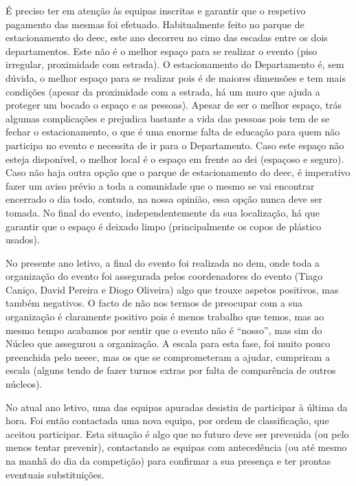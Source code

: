 É preciso ter em atenção às equipas inscritas e garantir que o respetivo pagamento das mesmas foi efetuado. Habitualmente feito no parque de estacionamento do \acrshort{deec}, este ano decorreu no cimo das escadas entre os dois departamentos. Este não é o melhor espaço para se realizar o evento (piso irregular, proximidade com estrada). O estacionamento do Departamento é, sem dúvida, o melhor espaço para se realizar pois é de maiores dimensões e tem mais condições (apesar da proximidade com a estrada, há um muro que ajuda a proteger um bocado o espaço e as pessoas). Apesar de ser o melhor espaço, trás algumas complicações e prejudica bastante a vida das pessoas pois tem de se fechar o estacionamento, o que é uma enorme falta de educação para quem não participa no evento e necessita de ir para o Departamento. Caso este espaço não esteja disponível, o melhor local é o espaço em frente ao \acrshort{dei} (espaçoso e seguro). Caso não haja outra opção que o parque de estacionamento do \acrshort{deec}, é imperativo fazer um aviso prévio a toda a comunidade que o mesmo se vai encontrar encerrado o dia todo, contudo, na nossa opinião, essa opção nunca deve ser tomada. No final do evento, independentemente da sua localização, há que garantir que o espaço é deixado limpo (principalmente os copos de plástico usados).

No presente ano letivo, a final do evento foi realizada no \acrshort{dem}, onde toda a organização do evento foi assegurada pelos coordenadores do evento (Tiago Caniço, David Pereira e Diogo Oliveira) algo que trouxe aspetos positivos, mas também negativos. O facto de não nos termos de preocupar com a sua organização é claramente positivo pois é menos trabalho que temos, mas ao mesmo tempo acabamos por sentir que o evento não é “nosso”, mas sim do Núcleo que assegurou a organização. A escala para esta fase, foi muito pouco preenchida pelo \acrshort{neeec}, mas os que se comprometeram a ajudar, cumpriram a escala (alguns tendo de fazer turnos extras por falta de comparência de outros núcleos).

No atual ano letivo, uma das equipas apuradas desistiu de participar à última da hora. Foi então contactada uma nova equipa, por ordem de classificação, que aceitou participar. Esta situação é algo que no futuro deve ser prevenida (ou pelo menos tentar prevenir), contactando as equipas com antecedência (ou até mesmo na manhã do dia da competição) para confirmar a sua presença e ter prontas eventuais substituições.
